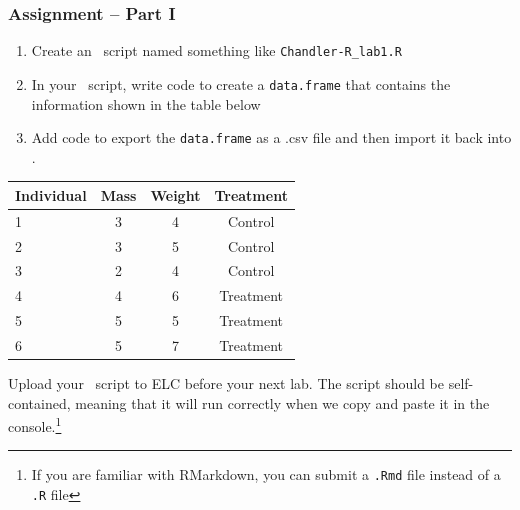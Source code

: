 \documentclass[color=usenames,dvipsnames]{beamer}\usepackage[]{graphicx}\usepackage[]{color}
\begin{document}
\begin{frame}[fragile]
  \frametitle{Assignment -- Part I}
  \footnotesize
  \begin{enumerate}[\bf (1)]
    \item Create an \R~script named something like \verb+Chandler-R_lab1.R+
    \item In your \R~script, write code to create a \verb+data.frame+
      that contains the information shown in the table below
    \item Add code to export the \verb+data.frame+ as a .csv file and
      then import it back into \R.
  \end{enumerate}
  \begin{center}
    \scriptsize
    \begin{tabular}{lccc}
      \hline
      Individual & Mass & Weight & Treatment \\
      \hline
      1 & 3 & 4 & Control \\
      2 & 3 & 5 & Control \\
      3 & 2 & 4 & Control \\
      4 & 4 & 6 & Treatment \\
      5 & 5 & 5 & Treatment \\
      6 & 5 & 7 & Treatment \\
      \hline
    \end{tabular}
  \end{center}
  Upload your \R~script to ELC before your next lab. The script should
  be self-contained, meaning that it will run correctly when we copy
  and paste it in the console.\footnote{\scriptsize \noindent If you
    are familiar with RMarkdown, you can submit a \texttt{.Rmd} file
    instead of a \texttt{.R} file }
\end{frame}
\end{document}
